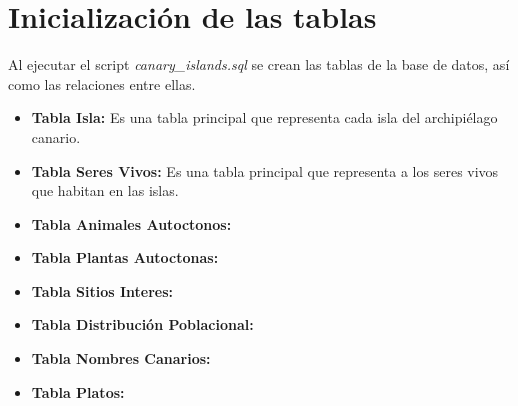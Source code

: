 \documentclass[11pt]{report}
\begin{document}
\section{Inicialización de las tablas}
Al ejecutar el script \emph{canary\_islands.sql} se crean las tablas de la base de datos, así como las relaciones entre ellas.
\begin{itemize}
      \item \textbf{Tabla Isla:} Es una tabla principal que representa cada isla del archipiélago canario.
            \lstset{style=mystyle}
            

      \item \textbf{Tabla Seres Vivos:} Es una tabla principal que representa a los seres vivos que habitan en las islas.
            \lstset{style=mystyle}
            

      \item \textbf{Tabla Animales Autoctonos:} 
            \lstset{style=mystyle}
            

            \newpage

      \item \textbf{Tabla Plantas Autoctonas:} 
            \lstset{style=mystyle}
            

      \item \textbf{Tabla Sitios Interes:}
            \lstset{style=mystyle}
            

      \item \textbf{Tabla Distribución Poblacional:}
            \lstset{style=mystyle}
            

      \item \textbf{Tabla Nombres Canarios:}
            \lstset{style=mystyle}
            

            \newpage

      \item \textbf{Tabla Platos:}
            \lstset{style=mystyle}
            


\end{itemize}
\end{document}
